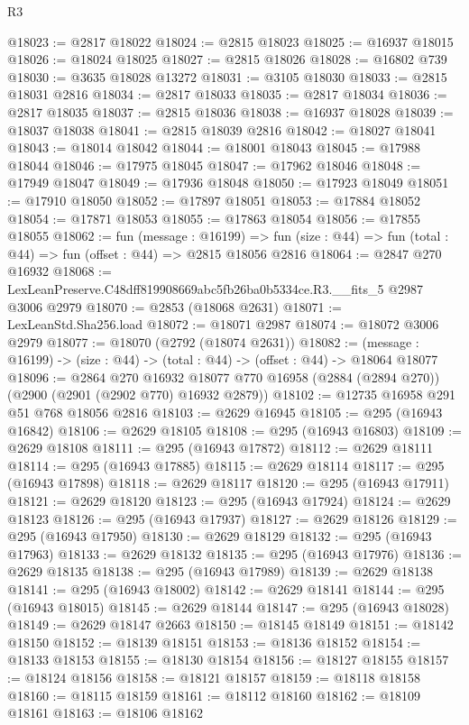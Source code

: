 \begin{lexlean}{R3}
\begin{coremodule}
@18023 := @2817 @18022
@18024 := @2815 @18023
@18025 := @16937 @18015
@18026 := @18024 @18025
@18027 := @2815 @18026
@18028 := @16802 @739
@18030 := @3635 @18028 @13272
@18031 := @3105 @18030
@18033 := @2815 @18031 @2816
@18034 := @2817 @18033
@18035 := @2817 @18034
@18036 := @2817 @18035
@18037 := @2815 @18036
@18038 := @16937 @18028
@18039 := @18037 @18038
@18041 := @2815 @18039 @2816
@18042 := @18027 @18041
@18043 := @18014 @18042
@18044 := @18001 @18043
@18045 := @17988 @18044
@18046 := @17975 @18045
@18047 := @17962 @18046
@18048 := @17949 @18047
@18049 := @17936 @18048
@18050 := @17923 @18049
@18051 := @17910 @18050
@18052 := @17897 @18051
@18053 := @17884 @18052
@18054 := @17871 @18053
@18055 := @17863 @18054
@18056 := @17855 @18055
@18062 := fun (message : @16199) =>
  fun (size : @44) => fun (total : @44) => fun (offset : @44) => @2815 @18056 @2816
@18064 := @2847 @270 @16932
@18068 := LexLeanPreserve.C48dff819908669abc5fb26ba0b5334ce.R3.__fits_5 @2987 @3006 @2979
@18070 := @2853 (@18068 @2631)
@18071 := LexLeanStd.Sha256.load
@18072 := @18071 @2987
@18074 := @18072 @3006 @2979
@18077 := @18070 (@2792 (@18074 @2631))
@18082 := (message : @16199) -> (size : @44) -> (total : @44) -> (offset : @44) -> @18064 @18077
@18096 := @2864
    @270
    @16932
    @18077
    @770
    @16958
    (@2884 (@2894 @270))
    (@2900 (@2901 (@2902 @770) @16932 @2879))
@18102 := @12735 @16958 @291 @51 @768 @18056 @2816
@18103 := @2629 @16945
@18105 := @295 (@16943 @16842)
@18106 := @2629 @18105
@18108 := @295 (@16943 @16803)
@18109 := @2629 @18108
@18111 := @295 (@16943 @17872)
@18112 := @2629 @18111
@18114 := @295 (@16943 @17885)
@18115 := @2629 @18114
@18117 := @295 (@16943 @17898)
@18118 := @2629 @18117
@18120 := @295 (@16943 @17911)
@18121 := @2629 @18120
@18123 := @295 (@16943 @17924)
@18124 := @2629 @18123
@18126 := @295 (@16943 @17937)
@18127 := @2629 @18126
@18129 := @295 (@16943 @17950)
@18130 := @2629 @18129
@18132 := @295 (@16943 @17963)
@18133 := @2629 @18132
@18135 := @295 (@16943 @17976)
@18136 := @2629 @18135
@18138 := @295 (@16943 @17989)
@18139 := @2629 @18138
@18141 := @295 (@16943 @18002)
@18142 := @2629 @18141
@18144 := @295 (@16943 @18015)
@18145 := @2629 @18144
@18147 := @295 (@16943 @18028)
@18149 := @2629 @18147 @2663
@18150 := @18145 @18149
@18151 := @18142 @18150
@18152 := @18139 @18151
@18153 := @18136 @18152
@18154 := @18133 @18153
@18155 := @18130 @18154
@18156 := @18127 @18155
@18157 := @18124 @18156
@18158 := @18121 @18157
@18159 := @18118 @18158
@18160 := @18115 @18159
@18161 := @18112 @18160
@18162 := @18109 @18161
@18163 := @18106 @18162

\end{coremodule}
\end{lexlean}
